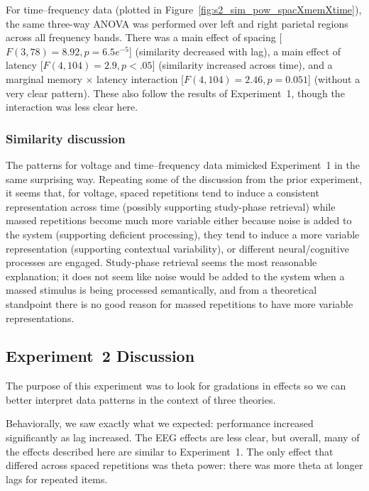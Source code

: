 For time--frequency data (plotted in Figure~\ref{fig:s2_sim_pow_spacXmemXtime}), the same three-way ANOVA was performed over left and right parietal regions across all frequency bands.
There was a main effect of spacing [$F(3,78)=8.92, p=6.5e^{-5}$] (similarity decreased with lag), a main effect of latency [$F(4,104)=2.9, p<.05$] (similarity increased across time), and a marginal memory $\times$ latency interaction [$F(4,104)=2.46, p=0.051$] (without a very clear pattern).  These also follow the results of Experiment~1, though the interaction was less clear here.

\subsubsection{Similarity discussion}

The patterns for voltage and time--frequency data mimicked Experiment~1 in the same surprising way.  Repeating some of the discussion from the prior experiment, it seems that, for voltage, spaced repetitions tend to induce a consistent representation across time (possibly supporting study-phase retrieval) while massed repetitions become much more variable either because noise is added to the system (supporting deficient processing), they tend to induce a more variable representation (supporting contextual variability), or different neural/cognitive processes are engaged.  Study-phase retrieval seems the most reasonable explanation; it does not seem like noise would be added to the system when a massed stimulus is being processed semantically, and from a theoretical standpoint there is no good reason for massed repetitions to have more variable representations.

\subsection{Experiment~2 Discussion}

The purpose of this experiment was to look for gradations in effects so we can better interpret data patterns in the context of three theories.

Behaviorally, we saw exactly what we expected: performance increased significantly as lag increased.  The EEG effects are less clear, but overall, many of the effects described here are similar to Experiment~1.  The only effect that differed across spaced repetitions was theta power: there was more theta at longer lags for repeated items.


